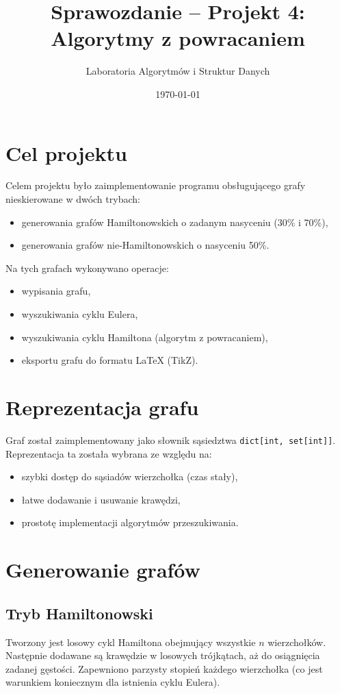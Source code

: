 \documentclass[a4paper,12pt]{article}
\title{Sprawozdanie -- Projekt 4: Algorytmy z powracaniem}
\author{Laboratoria Algorytmów i Struktur Danych}
\date{\today}
\begin{document}
\maketitle

\section{Cel projektu}
Celem projektu było zaimplementowanie programu obsługującego grafy nieskierowane w dwóch trybach:
\begin{itemize}
    \item generowania grafów Hamiltonowskich o zadanym nasyceniu (30\% i 70\%),
    \item generowania grafów nie-Hamiltonowskich o nasyceniu 50\%.
\end{itemize}
Na tych grafach wykonywano operacje:
\begin{itemize}
    \item wypisania grafu,
    \item wyszukiwania cyklu Eulera,
    \item wyszukiwania cyklu Hamiltona (algorytm z powracaniem),
    \item eksportu grafu do formatu LaTeX (TikZ).
\end{itemize}

\section{Reprezentacja grafu}
Graf został zaimplementowany jako słownik sąsiedztwa \texttt{dict[int, set[int]]}. Reprezentacja ta została wybrana ze względu na:

\begin{itemize}
    \item szybki dostęp do sąsiadów wierzchołka (czas stały),
    \item łatwe dodawanie i usuwanie krawędzi,
    \item prostotę implementacji algorytmów przeszukiwania.
\end{itemize}

\section{Generowanie grafów}
\subsection{Tryb Hamiltonowski}
Tworzony jest losowy cykl Hamiltona obejmujący wszystkie $n$ wierzchołków. Następnie dodawane są krawędzie w losowych trójkątach, aż do osiągnięcia zadanej gęstości. Zapewniono parzysty stopień każdego wierzchołka (co jest warunkiem koniecznym dla istnienia cyklu Eulera).
\end{document}

